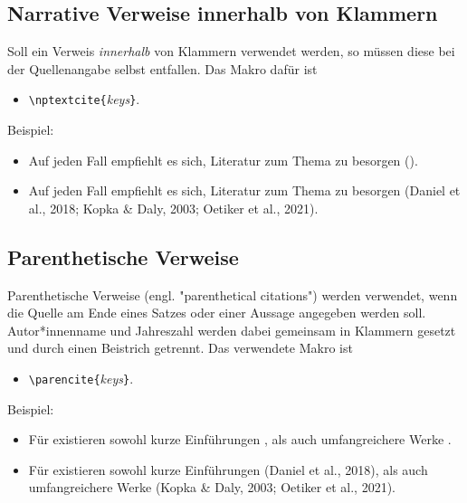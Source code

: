 \subsection{Narrative Verweise innerhalb von Klammern}

Soll ein Verweis \emph{innerhalb} von Klammern verwendet werden, so müssen diese bei der Quellenangabe selbst
entfallen. Das Makro dafür ist
%
\begin{itemize}
\item[] \verb!\nptextcite{!\textit{keys}\verb!}!.
\end{itemize}
%
Beispiel:
%
\begin{itemize}
\item[]
\begin{LaTeXCode}[numbers=none,breakindent=0pt]
	Auf jeden Fall empfiehlt es sich, Literatur zum Thema \latex zu besorgen (\zB {}).
\end{LaTeXCode}
\item[]
Auf jeden Fall empfiehlt es sich, Literatur zum Thema \latex zu besorgen (\zB Daniel et al., 2018; Kopka \& Daly,
2003; Oetiker et al., 2021).
\end{itemize}

\subsection{Parenthetische Verweise}

Parenthetische Verweise (engl. "parenthetical citations") werden verwendet, wenn die Quelle am Ende eines Satzes oder
einer Aussage angegeben werden soll. Autor*innen\-name und Jahreszahl werden dabei gemeinsam in Klammern gesetzt und
durch einen Beistrich getrennt. Das verwendete Makro ist
%
\begin{itemize}
\item[] \verb!\parencite{!\textit{keys}\verb!}!.
\end{itemize}
%
Beispiel:
%
\begin{itemize}
\item[]
\begin{LaTeXCode}[numbers=none,breakindent=0pt]
Für \latex existieren sowohl kurze Einführungen \parencite{Daniel2018}, als auch umfangreichere Werke \parencite{Oetiker2021, Kopka2003}.
\end{LaTeXCode}
%
\item[] Für \latex existieren sowohl kurze Einführungen (Daniel et al., 2018), als auch umfangreichere Werke
(Kopka \& Daly, 2003; Oetiker et al., 2021).
\end{itemize}


